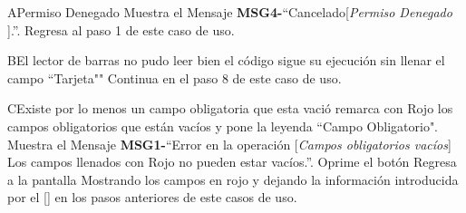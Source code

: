 	\begin{UCtrayectoriaA}{A}{Permiso Denegado}
			\UCpaso Muestra el Mensaje {\bf MSG4-}``Cancelado[{\em Permiso Denegado }].''.
			\UCpaso Regresa al paso 1 de este caso de uso.
		\end{UCtrayectoriaA}

		\begin{UCtrayectoriaA}{B}{El lector de barras no pudo leer bien el código}
			\UCpaso sigue su ejecución sin llenar el campo ``Tarjeta""
			\UCpaso Continua en el paso 8 de este caso de uso.	
		\end{UCtrayectoriaA}		
			\begin{UCtrayectoriaA}{C}{Existe por lo menos un campo obligatoria que esta vació}
			\UCpaso remarca con Rojo los campos obligatorios que están vacíos 
			y pone la leyenda ``Campo Obligatorio".
			\UCpaso Muestra el Mensaje {\bf MSG1-}``Error en la operación [{\em Campos obligatorios vacíos}] Los campos llenados con Rojo no pueden estar vacíos.''.
			\UCpaso[\UCactor] Oprime el botón 
			\UCpaso Regresa a la pantalla  Mostrando los campos en rojo y dejando la información introducida por el [\UCactor] en los pasos anteriores de este casos de uso.
		\end{UCtrayectoriaA}
